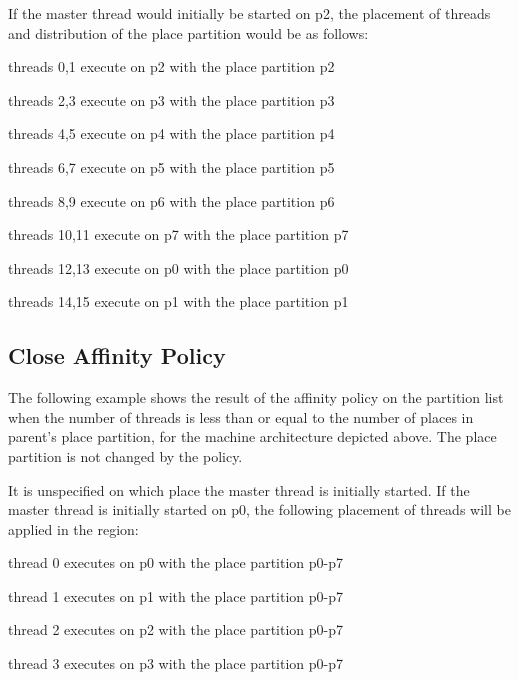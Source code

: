 If the master thread would initially be started on p2, the placement of threads 
and distribution of the place partition would be as follows:

\begin{compactitem}
\item threads 0,1 execute on p2 with the place partition p2

\item threads 2,3 execute on p3 with the place partition p3

\item threads 4,5 execute on p4 with the place partition p4

\item threads 6,7 execute on p5 with the place partition p5

\item threads 8,9 execute on p6 with the place partition p6

\item threads 10,11 execute on p7 with the place partition p7

\item threads 12,13 execute on p0 with the place partition p0

\item threads 14,15 execute on p1 with the place partition p1
\end{compactitem}

\subsection{Close Affinity Policy}
\label{subsec:affinity_close}

The following example shows the result of the  affinity policy on 
the partition list when the number of threads is less than or equal to the number 
of places in parent's place partition, for the machine architecture depicted above. 
The place partition is not changed by the  policy.



It is unspecified on which place the master thread is initially started. If the 
master thread is initially started on p0, the following placement of threads will 
be applied in the  region:

\begin{compactitem}
\item thread 0 executes on p0 with the place partition p0-p7

\item thread 1 executes on p1 with the place partition p0-p7

\item thread 2 executes on p2 with the place partition p0-p7

\item thread 3 executes on p3 with the place partition p0-p7
\end{compactitem}

